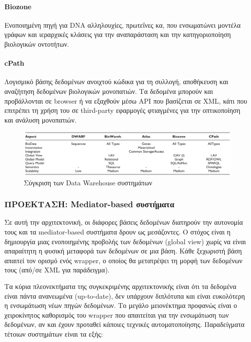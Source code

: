             \paragraph{Biozone}
                Ενοποιημένη πηγή για DNA αλληλουχίες, πρωτεΐνες κα, που ενσωματώνει μοντέλα γράφων και ιεραρχικές κλάσεις για την αναπαράσταση και την κατηγοριοποίηση βιολογικών οντοτήτων.

            \paragraph{cPath}
                Λογισμικό βάσης δεδομένων ανοιχτού κώδικα για τη συλλογή, αποθήκευση και αναζήτηση δεδομένων βιολογικών μονοπατιών.
                Τα δεδομένα μπορούν και προβάλλονται σε browser ή να εξαχθούν μέσω API που βασίζεται σε XML, κάτι που επιτρέπει τη χρήση του σε third-party εφαρμογές φτιαγμένες για την οπτικοποίηση και ανάλυση μονοπατιών.

            \begin{figure}[ht] \noindent\centering
                \includegraphics[scale=0.7]{img/Data warehouse table}
                \caption{Σύγκριση των Data Warehouse συστημάτων \cite{XMLbasedApproaches}}
            \end{figure}

        \subsubsection{ΠΡΟΕΚΤΑΣΗ: Mediator-based συστήματα}
            Σε αυτή την αρχιτεκτονική, οι διάφορες βάσεις δεδομένων διατηρούν την αυτονομία τους και τα mediator-based συστήματα δρουν ως μεσάζοντες.
            Ο στόχος είναι η δημιουργία μιας ενοποιημένης προβολής των δεδομένων (global view) χωρίς να είναι απαραίτητη η φυσική μεταφορά των δεδομένων σε μια βάση.
            Κάθε ξεχωριστή βάση απαιτεί τον ορισμό ενός wrapper, ο οποίος θα μετατρέψει τη μορφή των δεδομένων τους (από/σε XML για παράδειγμα).

            Τα κύρια πλεονεκτήματα της συγκεκριμένης αρχιτεκτονικής είναι ότι τα δεδομένα είναι πάντα ανανεωμένα (up-to-date), δεν υπάρχουν διπλότυπα και είναι ευκολότερη η ενσωμάτωση νέων πηγών δεδομένων.
            Το μεγάλο μειονέκτημα προφανώς είναι ο χειροκίνητος καθορισμός του wrapper που απαιτείται για την ενσωμάτωση των δεδομένων, αν και έχουν προταθεί κάποιες τεχνικές αυτοματοποίησης.
            Παραδείγματα τέτοιων συστημάτων είναι τα εξής:

